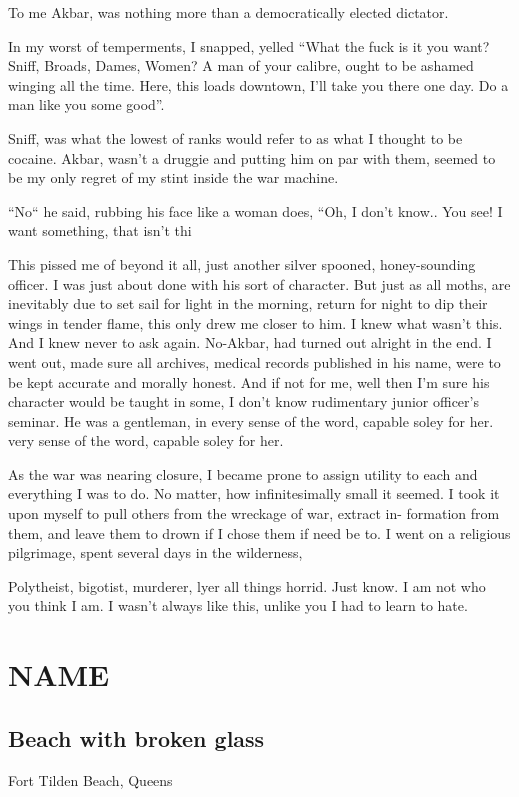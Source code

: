 \documentclass[19pt,openany]{book}
\begin{document}
To me Akbar, was nothing more
than a democratically elected dictator.

In my worst of temperments, I snapped, yelled
``What the fuck is it you want? Sniff, Broads,
Dames, Women? A man of your calibre, ought
to be ashamed winging all the time. Here,
this loads downtown, I'll take you there
one day. Do a man like you some good''.

Sniff, was what the lowest of ranks would
refer to as what I thought to be cocaine.
Akbar, wasn't a druggie and putting him on par
with them, seemed to be my only regret of my stint
inside the war machine.

``No`` he said, rubbing his face like a woman does,
``Oh, I don't know.. You see! I want something,
that isn't thi

This pissed me of beyond it all, just another
silver spooned, honey-sounding officer. I
was just about done with his sort of
character. But just as all moths, are inevitably
due to set sail for light in the morning,
return for night to dip their wings in tender flame,
this only drew me closer to him. I knew what wasn't this.
And I knew never to ask again. No-Akbar, had turned out
alright in the end. I went out, made sure all archives,
medical records published in his name, were to
be kept accurate and morally honest. And if not
for me, well then I'm sure his character would
be taught in some, I don't know rudimentary
junior officer's seminar. He was a gentleman, in
every sense of the word, capable soley for her.
very sense of the word, capable soley for her.

As the war was nearing closure, I became prone to assign utility to each
and everything I was to do. No matter, how infinitesimally small it seemed.
I took it upon myself to pull others from the wreckage of war, extract in-
formation from them, and leave them to drown if I chose them if need be
to. I went on a religious pilgrimage, spent several days in the wilderness,

Polytheist, bigotist, murderer, lyer
all things horrid. Just know. I am
not who you think I am. I wasn't
always like this, unlike you I had to learn
to hate.

\part{NAME}
\chapter{Beach with broken glass}
Fort Tilden Beach, Queens
\end{document}
